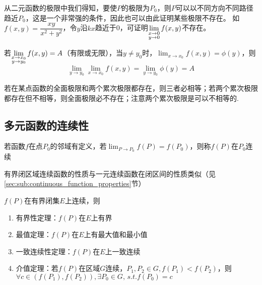 从二元函数的极限中我们得知，要使$P$的极限为$P_0$，则$P$可以以不同方向不同路径趋近$P_0$，这是一个非常强的条件，因此也可以由此证明某些极限不存在。
如$f(x,y)=\dfrac{xy}{x^2+y^2}$，令$y$沿$kx$趋近于0，可证明$\displaystyle\lim_{\substack{x\to 0\\y\to 0}}f(x,y)$不存在。
\begin{theorem}[全面极限与累次极限的关系]
若$\displaystyle\lim_{\substack{x\to x_0\\y\to y_0}}f(x,y)=A$（有限或无限），当$y\ne y_0$时，$\lim_{x\to x_0}f(x,y)=\phi(y)$，则
\[\lim_{y\to y_0}\lim_{x\to x_0}f(x,y)=\lim_{y\to y_0}\phi(y)=A\]
\end{theorem}
若在某点函数的全面极限和两个累次极限都存在，则三者必相等；若两个累次极限都存在但不相等，则全面极限必不存在；注意两个累次极限是可以不相等的.

\subsection{多元函数的连续性}
\begin{definition}[连续性]
若函数$f$在点$P_0$的邻域有定义，若$\lim_{P\to P_0}f(P)=f(P_0)$，则称$f(P)$在$P_0$连续
\end{definition}
有界闭区域连续函数的性质与一元连续函数在闭区间的性质类似（见\ref{sec:sub:continuous_function_properties}节）
\begin{theorem}
$f(P)$在有界闭集$E$上连续，则
\begin{enumerate}
	\item 有界性定理：$f(P)$在$E$上有界
	\item 最值定理：$f(P)$在$E$上有最大值和最小值
	\item 一致连续性定理：$f(P)$在$E$上一致连续
	\item 介值定理：若$f(P)$在区域$G$连续，$P_1,P_2\in G,f(P_1)<f(P_2)$，则$\forall c\in (f(P_1),f(P_2)),\exists P_0\in G,\,s.t. f(P_0)=c$
\end{enumerate}
\end{theorem}